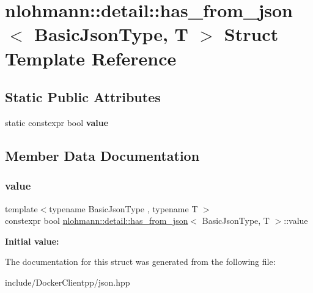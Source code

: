 \hypertarget{structnlohmann_1_1detail_1_1has__from__json}{}\section{nlohmann\+::detail\+::has\+\_\+from\+\_\+json$<$ Basic\+Json\+Type, T $>$ Struct Template Reference}
\label{structnlohmann_1_1detail_1_1has__from__json}
\subsection*{Static Public Attributes}
\begin{DoxyCompactItemize}
\item 
static constexpr bool {\bfseries value}
\end{DoxyCompactItemize}


\subsection{Member Data Documentation}
\mbox{\label{structnlohmann_1_1detail_1_1has__from__json_a16701d806343c58ae7e884024dd14955}} 
\subsubsection{\texorpdfstring{value}{value}}
{\footnotesize\ttfamily template$<$typename Basic\+Json\+Type , typename T $>$ \\
constexpr bool \mbox{\hyperlink{structnlohmann_1_1detail_1_1has__from__json}{nlohmann\+::detail\+::has\+\_\+from\+\_\+json}}$<$ Basic\+Json\+Type, T $>$\+::value\hspace{0.3cm}{\ttfamily [static]}}

{\bfseries Initial value\+:}
\begin{DoxyCode}{0}

\end{DoxyCode}


The documentation for this struct was generated from the following file\+:\begin{DoxyCompactItemize}
\item 
include/\+Docker\+Clientpp/json.\+hpp\end{DoxyCompactItemize}
